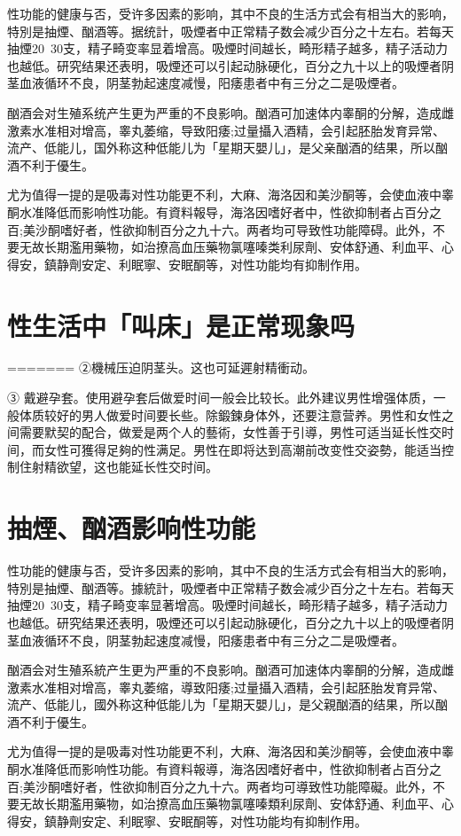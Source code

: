 \documentclass[12pt,UTF8]{ctexbook}
\begin{document}
性功能的健康与否，受许多因素的影响，其中不良的生活方式会有相当大的影响，特別是抽煙、酗酒等。据统計，吸煙者中正常精子数会减少百分之十左右。若每天抽煙20~30支，精子畸变率显着增高。吸煙时间越长，畸形精子越多，精子活动力也越低。研究结果还表明，吸煙还可以引起动脉硬化，百分之九十以上的吸煙者阴茎血液循环不良，阴茎勃起速度减慢，阳痿患者中有三分之二是吸煙者。

酗酒会对生殖系统产生更为严重的不良影响。酗酒可加速体内睾酮的分解，造成雌激素水准相对增高，睾丸萎缩，导致阳痿;过量攝入酒精，会引起胚胎发育异常、流产、低能儿，国外称这种低能儿为「星期天嬰儿」，是父亲酗酒的结果，所以酗酒不利于優生。

尤为值得一提的是吸毒对性功能更不利，大麻、海洛因和美沙酮等，会使血液中睾酮水准降低而影响性功能。有資料報导，海洛因嗜好者中，性欲抑制者占百分之百;美沙酮嗜好者，性欲抑制百分之九十六。两者均可导致性功能障碍。此外，不要无故长期濫用藥物，如治撩高血压藥物氯噻嗪类利尿劑、安体舒通、利血平、心得安，鎮静劑安定、利眠寧、安眠酮等，对性功能均有抑制作用。

\section{性生活中「叫床」是正常现象吗}
=======
②機械压迫阴茎头。这也可延遲射精衝动。

③ 戴避孕套。使用避孕套后做爱时间一般会比较长。此外建议男性增强体质，一般体质较好的男人做爱时间要长些。除鍛鍊身体外，还要注意营养。男性和女性之间需要默契的配合，做爱是两个人的藝術，女性善于引導，男性可适当延长性交时间，而女性可獲得足夠的性满足。男性在即将达到高潮前改变性交姿勢，能适当控制住射精欲望，这也能延长性交时间。

\section{抽煙、酗酒影响性功能}

性功能的健康与否，受许多因素的影响，其中不良的生活方式会有相当大的影响，特別是抽煙、酗酒等。據統計，吸煙者中正常精子数会减少百分之十左右。若每天抽煙20~30支，精子畸变率显著增高。吸煙时间越长，畸形精子越多，精子活动力也越低。研究结果还表明，吸煙还可以引起动脉硬化，百分之九十以上的吸煙者阴茎血液循环不良，阴茎勃起速度减慢，阳痿患者中有三分之二是吸煙者。

酗酒会对生殖系統产生更为严重的不良影响。酗酒可加速体内睾酮的分解，造成雌激素水准相对增高，睾丸萎缩，導致阳痿;过量攝入酒精，会引起胚胎发育异常、流产、低能儿，國外称这种低能儿为「星期天嬰儿」，是父親酗酒的结果，所以酗酒不利于優生。

尤为值得一提的是吸毒对性功能更不利，大麻、海洛因和美沙酮等，会使血液中睾酮水准降低而影响性功能。有資料報導，海洛因嗜好者中，性欲抑制者占百分之百;美沙酮嗜好者，性欲抑制百分之九十六。两者均可導致性功能障礙。此外，不要无故长期濫用藥物，如治撩高血压藥物氯噻嗪類利尿劑、安体舒通、利血平、心得安，鎮静劑安定、利眠寧、安眠酮等，对性功能均有抑制作用。
\end{document}
